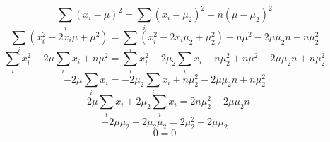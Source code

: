 \documentclass{article}
\begin{document}
\subsubsection{}
$$\sum_i(x_i-\mu)^2=\sum_i(x_i-\mu_2)^2+n(\mu-\mu_2)^2$$
$$\sum_i(x_i^2-2x_i\mu+\mu^2)=\sum_i(x_i^2-2x_i\mu_2+\mu_2^2)+n\mu^2-2\mu\mu_2n+n\mu_2^2$$
$$\sum_ix_i^2-2\mu\sum_ix_i+n\mu^2=\sum_ix_i^2-2\mu_2\sum_ix_i+n\mu_2^2+n\mu^2-2\mu\mu_2n+n\mu_2^2$$
$$-2\mu\sum_ix_i=-2\mu_2\sum_ix_i+n\mu_2^2-2\mu\mu_2n+n\mu_2^2$$
$$-2\mu\sum_ix_i+2\mu_2\sum_ix_i=2n\mu_2^2-2\mu\mu_2n$$
$$-2\mu\mu_2+2\mu_2\mu_2=2\mu_2^2-2\mu\mu_2$$
$$0=0$$
\subsubsection{}
\end{document}
